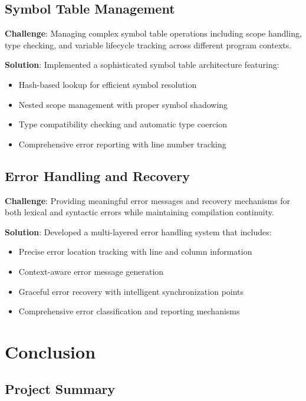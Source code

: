 \documentclass[12pt,a4paper]{article}
\begin{document}
\subsection{Symbol Table Management}

\textbf{Challenge}: Managing complex symbol table operations including scope handling, type checking, and variable lifecycle tracking across different program contexts.

\textbf{Solution}: Implemented a sophisticated symbol table architecture featuring:

\begin{itemize}[itemsep=2pt]
    \item Hash-based lookup for efficient symbol resolution
    \item Nested scope management with proper symbol shadowing
    \item Type compatibility checking and automatic type coercion
    \item Comprehensive error reporting with line number tracking
\end{itemize}

\subsection{Error Handling and Recovery}

\textbf{Challenge}: Providing meaningful error messages and recovery mechanisms for both lexical and syntactic errors while maintaining compilation continuity.

\textbf{Solution}: Developed a multi-layered error handling system that includes:

\begin{itemize}[itemsep=2pt]
    \item Precise error location tracking with line and column information
    \item Context-aware error message generation
    \item Graceful error recovery with intelligent synchronization points
    \item Comprehensive error classification and reporting mechanisms
\end{itemize}

\section{Conclusion}

\subsection{Project Summary}
\end{document}
